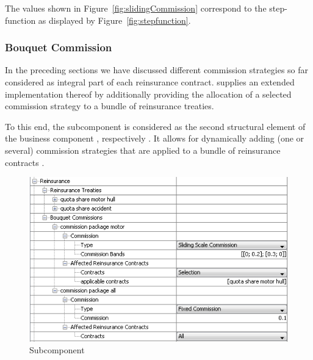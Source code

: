 The values
shown in Figure~\ref{fig:slidingCommission} correspond to the step-function as displayed by Figure~\ref{fig:stepfunction}.




\subsubsection{Bouquet Commission}
\label{subsubsec:bouquetCommission}

In the preceding sections we have discussed different commission strategies
so far considered as integral part of each reinsurance contract. \RA{}
supplies an extended implementation thereof by  additionally providing the allocation of a selected
commission strategy to a bundle of reinsurance treaties.

To this end, the subcomponent  is considered as the
second structural element of the business component , respectively . 
It allows for dynamically adding (one or several)
commission strategies that are applied to a bundle of reinsurance contracts 
.

\begin{figure}[htb]
	\centering
		\includegraphics[scale=0.6]{images/bouquetCommission.png}
	\caption{Subcomponent }
	\label{fig:bouquetCommission}
\end{figure}

